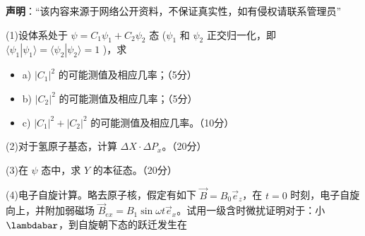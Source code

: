 
\textbf{声明}：“该内容来源于网络公开资料，不保证真实性，如有侵权请联系管理员”

    (1)设体系处于 $\psi = C_1 \psi_1 + C_2 \psi_2$ 态 ($\psi_1$ 和 $\psi_2$ 正交归一化，即 $\langle \psi_1 | \psi_1 \rangle = \langle \psi_2 | \psi_2 \rangle = 1$ )，求
     
    \begin{itemize}
        \item a) $|C_1|^2$ 的可能测值及相应几率；（5分）
        \item b) $|C_2|^2$ 的可能测值及相应几率；（5分）
        \item c) $|C_1|^2 + |C_2|^2$ 的可能测值及相应几率。（10分）
   \end{itemize}
 
    (2)对于氢原子基态，计算 $\Delta X \cdot \Delta P_x$。（20分）

    (3)在 $\psi$ 态中，求 $Y$ 的本征态。（20分）
    
    (4)电子自旋计算。略去原子核，假定有如下 $\vec{B} = B_0 \vec{e}_z$，在 $t=0$ 时刻，电子自旋向上，并附加弱磁场 $\vec{B}_{ex} = B_1 \sin \omega t \vec{e}_x$。试用一级含时微扰证明对于：小 $\lambdabar$，到自旋朝下态的跃迁发生在